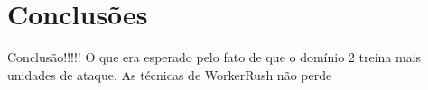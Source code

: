
\chapter{\label{concl}Conclusões}

Conclusão!!!!!
O que era esperado pelo fato de que o domínio 2 treina mais unidades de ataque.
As técnicas de WorkerRush não perde
